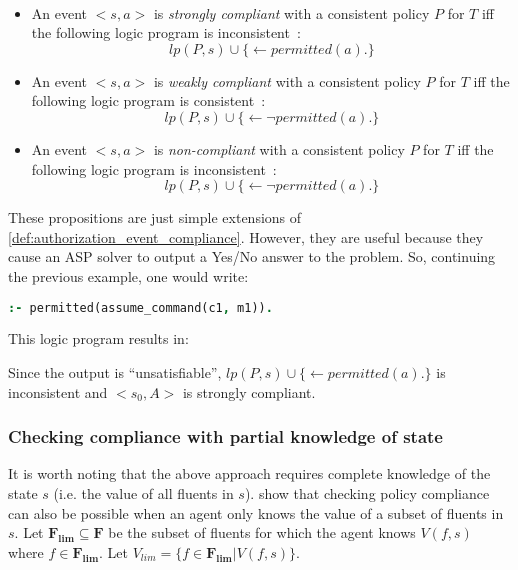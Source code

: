 \begin{definition}
    \label{def:authorization_event_compliance_full_knowledge}
    ~

    \begin{itemize}
        \item An event $<s, a>$ is \textit{strongly compliant} with a consistent policy $P$ for $T$ iff the following logic program is inconsistent~\citep{gelfond_authorization_2008}:
            \[
                lp(P, s) \cup \{ \leftarrow permitted(a). \}
            \]
        \item An event $<s, a>$ is \textit{weakly compliant} with a consistent policy $P$ for $T$ iff the following logic program is consistent~\citep{gelfond_authorization_2008}:
            \[
                lp(P, s) \cup \{ \leftarrow \neg permitted(a). \}
            \]
        \item An event $<s, a>$ is \textit{non-compliant} with a consistent policy $P$ for $T$ iff the following logic program is inconsistent~\citep{gelfond_authorization_2008}:
            \[
                lp(P, s) \cup \{ \leftarrow \neg permitted(a). \}
            \]
    \end{itemize}
\end{definition}

These propositions are just simple extensions of \cref{def:authorization_event_compliance}.
However, they are useful because they cause an ASP solver to output a Yes/No answer to the problem.
So, continuing the previous example, one would write:
\begin{lstlisting}[language=Prolog]
:- permitted(assume_command(c1, m1)).
\end{lstlisting}
This logic program results in:

Since the output is ``unsatisfiable'', $lp(P, s) \cup \{ \leftarrow permitted(a). \}$ is inconsistent and $<s_0, A>$ is strongly compliant.

\subsubsection{Checking compliance with partial knowledge of state}

It is worth noting that the above approach requires complete knowledge of the state $s$ (i.e. the value of all fluents in $s$).
\citet{gelfond_authorization_2008} show that checking policy compliance can also be possible when an agent only knows the value of a subset of fluents in $s$.
Let $\boldsymbol{F_{lim}} \subseteq \boldsymbol{F}$ be the subset of fluents for which the agent knows $V(f, s)$ where $f \in \boldsymbol{F_{lim}}$.
Let $V_{lim} = \{ f \in \boldsymbol{F_{lim}} | V(f, s)\}$.


